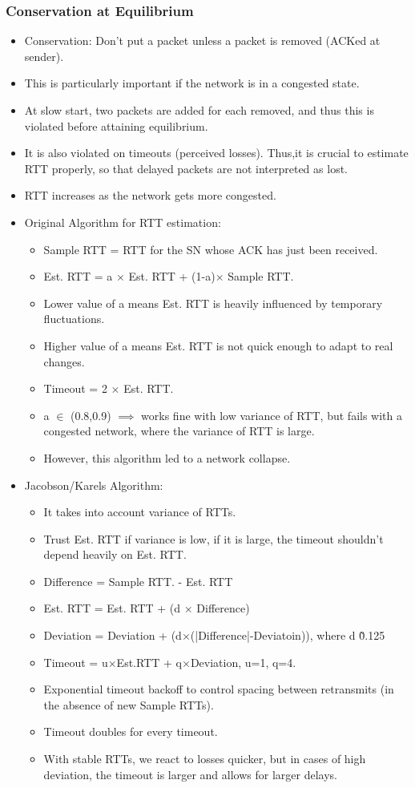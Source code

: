 \documentclass{report}
\begin{document}
\subsubsection{Conservation at Equilibrium}
\begin{itemize}
\item Conservation: Don't put a packet unless a packet is removed (ACKed at sender).
\item This is particularly important if the network is in a congested state.
\item At slow start, two packets are added for each removed, and thus this is violated before attaining equilibrium.
\item It is also violated on timeouts (perceived losses). Thus,it is crucial to estimate RTT properly, so that delayed packets are not interpreted as lost.
\item RTT increases as the network gets more congested.
\item Original Algorithm for RTT estimation:
\begin{itemize}
\item Sample RTT = RTT for the SN whose ACK has just been received.
\item Est. RTT = a $\times$ Est. RTT + (1-a)$\times$ Sample RTT.
\item Lower value of a means Est. RTT is heavily influenced by temporary fluctuations.
\item Higher value of a means Est. RTT is not quick enough to adapt to real changes.
\item Timeout = 2 $\times$ Est. RTT.
\item a $\in$ (0.8,0.9) $\implies$ works fine with low variance of RTT, but fails with a congested network, where the variance of RTT is large.
\item However, this algorithm led to a network collapse.
\end{itemize}
\item Jacobson/Karels Algorithm:
\begin{itemize}
    \item It takes into account variance of RTTs.
    \item Trust Est. RTT if variance is low, if it is large, the timeout shouldn't depend heavily on Est. RTT.
    \item Difference = Sample RTT. - Est. RTT
    \item Est. RTT = Est. RTT + (d $\times$ Difference)
    \item Deviation = Deviation + (d$\times$(|Difference|-Deviatoin)), where d \~ 0.125
    \item Timeout = u$\times$Est.RTT + q$\times$Deviation, u=1, q=4.
    \item Exponential timeout backoff to control spacing between retransmits (in the absence of new Sample RTTs).
    \item Timeout doubles for every timeout.
    \item With stable RTTs, we react to losses quicker, but in cases of high deviation, the timeout is larger and allows for larger delays.
\end{itemize}
\end{itemize}
\end{document}
